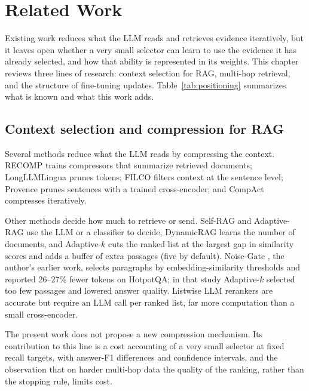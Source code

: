 \chapter{Related Work}
\label{chap:related}

Existing work reduces what the LLM reads and retrieves evidence iteratively, but it leaves open whether a very small selector can learn to use the evidence it has already selected, and how that ability is represented in its weights. This chapter reviews three lines of research: context selection for RAG, multi-hop retrieval, and the structure of fine-tuning updates. Table~\ref{tab:positioning} summarizes what is known and what this work adds.

\section{Context selection and compression for RAG}

Several methods reduce what the LLM reads by compressing the context. RECOMP \cite{xu2024recomp} trains compressors that summarize retrieved documents; LongLLMLingua \cite{jiang2024longllmlingua} prunes tokens; FILCO \cite{wang2023filco} filters context at the sentence level; Provence \cite{chirkova2025provence} prunes sentences with a trained cross-encoder; and CompAct \cite{yoon2024compact} compresses iteratively.

Other methods decide how much to retrieve or send. Self-RAG \cite{asai2024selfrag} and Adaptive-RAG \cite{jeong2024adaptiverag} use the LLM or a classifier to decide, DynamicRAG \cite{sun2025dynamicrag} learns the number of documents, and Adaptive-$k$ \cite{taguchi2025adaptivek} cuts the ranked list at the largest gap in similarity scores and adds a buffer of extra passages (five by default). Noise-Gate \cite{lavado2027noisegate}, the author's earlier work, selects paragraphs by embedding-similarity thresholds and reported 26--27\% fewer tokens on HotpotQA; in that study Adaptive-$k$ selected too few passages and lowered answer quality. Listwise LLM rerankers \cite{sun2023rankgpt,reddy2024first} are accurate but require an LLM call per ranked list, far more computation than a small cross-encoder.

The present work does not propose a new compression mechanism. Its contribution to this line is a cost accounting of a very small selector at fixed recall targets, with answer-F1 differences and confidence intervals, and the observation that on harder multi-hop data the quality of the ranking, rather than the stopping rule, limits cost.

